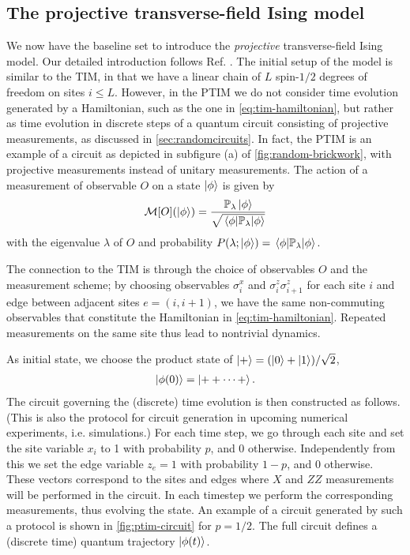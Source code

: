 \subsection{The projective transverse-field Ising model}\label{sec:the-ptim}
We now have the baseline set to introduce the \emph{projective}
transverse-field Ising model. Our detailed introduction follows Ref.
\cite{langEntanglementTransitionProjective2020}. 
The initial setup of the model is similar to the
TIM, in that we have a linear chain of $L$ spin-$1 /2$ degrees of freedom on sites
$i\leq L$. However, in the PTIM we do not consider time evolution generated by
a Hamiltonian, such as the one in \cref{eq:tim-hamiltonian}, but rather as time
evolution in discrete steps of a quantum circuit consisting of projective
measurements, as discussed in \cref{sec:randomcircuits}. In fact, the PTIM is
an example of a circuit as depicted in subfigure (a) of
\cref{fig:random-brickwork}, with projective measurements instead of unitary
measurements.
The action of a measurement of observable $O$ on a state
$\ket{\phi}$ is given by
\begin{align}
  \mathcal{M}[O](\ket{\phi}) =
  \frac{\mathbb{P}_\lambda\ket{\phi}}{\sqrt{\expval{\mathbb{P}_\lambda}{\phi}}}
\end{align}
with the eigenvalue $\lambda$ of $O$ and probability $P(\lambda;
\ket{\phi}) = \expval{\mathbb{P}_\lambda}{\phi}$.

The connection to the TIM is through the choice of observables $O$ and the
measurement scheme; by choosing
observables $\sigma^x_i$ and $\sigma_i^z\sigma_{i+1}^z$ for each site $i$ and
edge between adjacent sites $e=(i,i+1)$, we have the same non-commuting observables that
constitute the Hamiltonian in \cref{eq:tim-hamiltonian}. Repeated measurements
on the same site thus lead to nontrivial dynamics.

As initial state, we choose the product state of $\ket{+} = (\ket{0} + \ket{1})
/ \sqrt{2}$,
\begin{align}
  \ket{\phi(0)} = \ket{++\cdots +}
.\end{align}
The circuit governing the (discrete) time evolution is then constructed as
follows. (This is also the protocol for circuit generation in upcoming numerical
experiments, i.e. simulations.) For each time step, we go through each site and
set the site variable $x_i$ to 1 with probability $p$, and 0 otherwise.
Independently from this we set the edge variable $z_e=1$ with probability
$1-p$, and 0 otherwise. These vectors correspond to the sites and edges where
$X$ and $ZZ$ measurements will be performed in the circuit. In each timestep we
perform the corresponding measurements, thus evolving the state. An example of
a circuit generated by such a protocol is shown in \cref{fig:ptim-circuit} for
$p=1 /2$. The full circuit defines a (discrete time) quantum trajectory
$\ket{\phi(t)}$.

